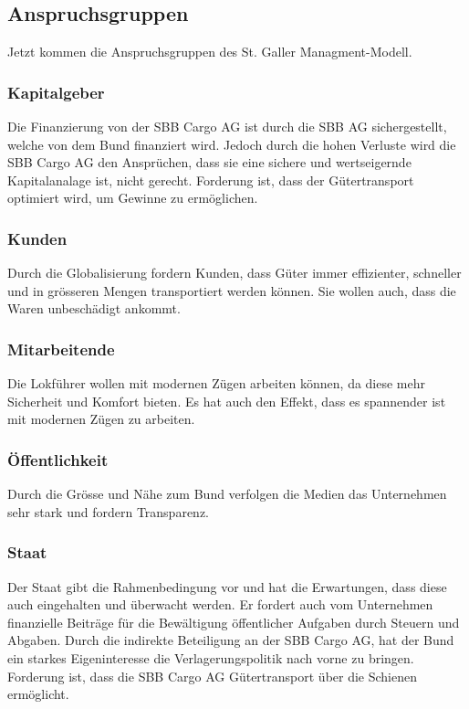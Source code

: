 \documentclass{article}
\begin{document}
\subsection{Anspruchsgruppen}

Jetzt kommen die Anspruchsgruppen des St. Galler Managment-Modell.

\subsubsection{Kapitalgeber}
Die Finanzierung von der SBB Cargo AG ist durch die SBB AG sichergestellt, welche von dem Bund finanziert wird.
Jedoch durch die hohen Verluste wird die SBB Cargo AG den Ansprüchen, dass sie eine sichere und wertseigernde Kapitalanalage ist, nicht gerecht.
Forderung ist, dass der Gütertransport optimiert wird, um Gewinne zu ermöglichen.

\subsubsection{Kunden}
Durch die Globalisierung fordern Kunden, dass Güter immer effizienter, schneller und in grösseren Mengen transportiert werden können.
Sie wollen auch, dass die Waren unbeschädigt ankommt.

\subsubsection{Mitarbeitende}
Die Lokführer wollen mit modernen Zügen arbeiten können, da diese mehr Sicherheit und Komfort bieten.
Es hat auch den Effekt, dass es spannender ist mit modernen Zügen zu arbeiten. 

\subsubsection{Öffentlichkeit}
Durch die Grösse und Nähe zum Bund verfolgen die Medien das Unternehmen sehr stark und fordern Transparenz.

\subsubsection{Staat}
Der Staat gibt die Rahmenbedingung vor und hat die Erwartungen, dass diese auch eingehalten und überwacht werden.
Er fordert auch vom Unternehmen finanzielle Beiträge für die Bewältigung öffentlicher Aufgaben durch Steuern und Abgaben.
Durch die indirekte Beteiligung an der SBB Cargo AG, hat der Bund ein starkes Eigeninteresse die Verlagerungspolitik nach vorne zu bringen.
Forderung ist, dass die SBB Cargo AG Gütertransport über die Schienen ermöglicht.
\end{document}
